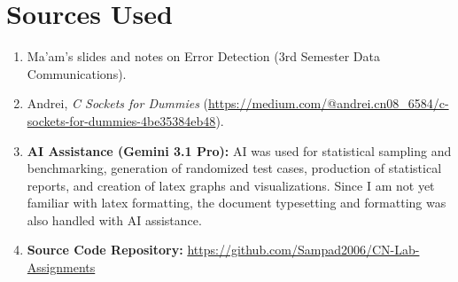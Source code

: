 \documentclass[12pt,a4paper]{article}
\begin{document}
\section{Sources Used}
\begin{enumerate}[leftmargin=*]
    \item Ma'am's slides and notes on Error Detection (3rd Semester Data Communications).
    \item Andrei, \textit{C Sockets for Dummies} (\url{https://medium.com/@andrei.cn08_6584/c-sockets-for-dummies-4be35384eb48}).
    \item \textbf{AI Assistance (Gemini 3.1 Pro):} AI was used for statistical sampling and benchmarking, generation of randomized test cases, production of statistical reports, and creation of latex graphs and visualizations. Since I am not yet familiar with latex formatting, the document typesetting and formatting was also handled with AI assistance.
    \item \textbf{Source Code Repository:} \url{https://github.com/Sampad2006/CN-Lab-Assignments}
\end{enumerate}
\end{document}
